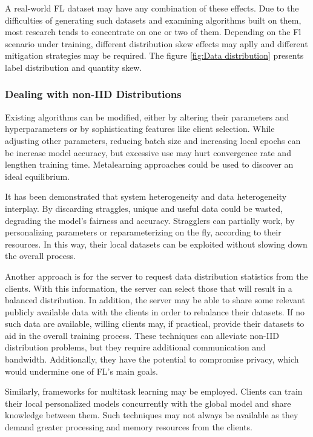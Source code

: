 A real-world FL dataset may have any combination of these effects. Due to the difficulties of generating such datasets and examining algorithms built on them, most research tends to concentrate on one or two of them. Depending on the Fl scenario under training, different distribution skew effects may aplly and different mitigation strategies may be required. The figure \ref{fig:Data distribution} presents label distribution and quantity skew.

\subsubsection{Dealing with non-IID Distributions}
Existing algorithms can be modified, either by altering their parameters and hyperparameters or by sophisticating features like client selection. While adjusting other parameters, reducing batch size and increasing local epochs can be increase model accuracy, but excessive use may hurt convergence rate and lengthen training time. Metalearning approaches could be used to discover an ideal equilibrium.

It has been demonstrated that system heterogeneity and data heterogeneity interplay. By discarding straggles, unique and useful data could be wasted, degrading the model's fairness and accuracy. Stragglers can partially work, by personalizing parameters or reparameterizing on the fly, according to their resources. In this way, their local datasets can be exploited without slowing down the overall process.

Another approach is for the server to request data distribution statistics from the clients. With this information, the server can select those that will result in a balanced distribution. In addition, the server may be able to share some relevant publicly available data with the clients in order to rebalance their datasets. If no such data are available, willing clients may, if practical, provide their datasets to aid in the overall training process. These techniques can alleviate non-IID distribution problems, but they require additional communication and bandwidth. Additionally, they have the potential to compromise privacy, which would undermine one of FL's main goals.

Similarly, frameworks for multitask learning may be employed. Clients can train their local personalized models concurrently with the global model and share knowledge between them. Such techniques may not always be available as they demand greater processing and memory resources from the clients.


